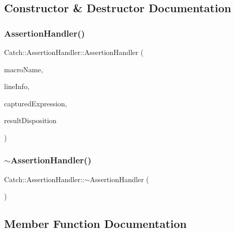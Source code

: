 \subsection{Constructor \& Destructor Documentation}
\mbox{\label{class_catch_1_1_assertion_handler_a32efbb1b56b71d758d4c2094bac1f1a9}} 
\subsubsection{AssertionHandler()}
{\footnotesize\ttfamily Catch\+::\+Assertion\+Handler\+::\+Assertion\+Handler (\begin{DoxyParamCaption}\item[{\textbf{ String\+Ref} const \&}]{macro\+Name,  }\item[{\textbf{ Source\+Line\+Info} const \&}]{line\+Info,  }\item[{\textbf{ String\+Ref}}]{captured\+Expression,  }\item[{\textbf{ Result\+Disposition\+::\+Flags}}]{result\+Disposition }\end{DoxyParamCaption})}

\mbox{\label{class_catch_1_1_assertion_handler_a1e839d810f6ac0fa6d127fe8350175ed}} 
\subsubsection{$\sim$AssertionHandler()}
{\footnotesize\ttfamily Catch\+::\+Assertion\+Handler\+::$\sim$\+Assertion\+Handler (\begin{DoxyParamCaption}{ }\end{DoxyParamCaption})\hspace{0.3cm}{\ttfamily [inline]}}



\subsection{Member Function Documentation}
\mbox{\label{class_catch_1_1_assertion_handler_a193bb3999494c46457f3059184c6b251}} 
